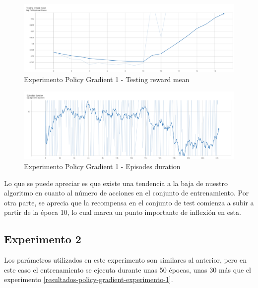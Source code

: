 \begin{figure}[H]
	\centering
	\includegraphics[width=1\textwidth]{figuras/experiments/policy_gradient/policy_gradient_normalized_image_reward_20_epochs/testing_reward_mean.png}
	\caption[Experimento Policy Gradient 1 - Testing reward mean]{Experimento Policy Gradient 1 - Testing reward mean}
	\label{fig-experimento-policy-gradient-1-testing-reward-mean}
\end{figure}
\begin{figure}[H]
	\centering
	\includegraphics[width=1\textwidth]{figuras/experiments/policy_gradient/policy_gradient_normalized_image_reward_20_epochs/episodes_duration.png}
	\caption[Experimento Policy Gradient 1 - Episodes duration]{Experimento Policy Gradient 1 - Episodes duration}
	\label{fig-experimento-policy-gradient-1-episodes-duration}
\end{figure}

Lo que se puede apreciar es que existe una tendencia a la baja de nuestro algoritmo en cuanto al número de acciones en el conjunto de entrenamiento. Por otra parte, se aprecia que la recompensa en el conjunto de test comienza a subir a partir de la época 10, lo cual marca un punto importante de inflexión en esta. 

\subsection{Experimento 2}
\label{resultados-policy-gradient-experimento-2}

Los parámetros utilizados en este experimento son similares al anterior, pero en este caso el entrenamiento se ejecuta durante unas 50 épocas, unas 30 más que el experimento \ref{resultados-policy-gradient-experimento-1}.
\medskip

